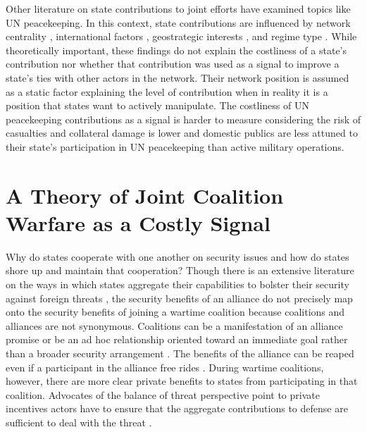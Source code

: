 \documentclass[12pt,letterpaper]{article}
\begin{document}
	Other literature on state contributions to joint efforts have examined topics like UN peacekeeping. In this context, state contributions are influenced by network centrality \citep{dorussen_networkedinternationalpolitics_2016}, international factors \citep{mullenbach_decidingkeeppeace_2005}, geostrategic interests \citep{baltrusaitis_friendsindeedcoalition_2008}, and regime type \citep{lebovic_unitingpeacedemocracies_2004}. While theoretically important, these findings do not explain the costliness of a state's contribution nor whether that contribution was used as a signal to improve a state's ties with other actors in the network. Their network position is assumed as a static factor explaining the level of contribution when in reality it is a position that states want to actively manipulate. The costliness of UN peacekeeping contributions as a signal is harder to measure considering the risk of casualties and collateral damage is lower and domestic publics are less attuned to their state's participation in UN peacekeeping than active military operations. 

\section{A Theory of Joint Coalition Warfare as a Costly Signal}
	Why do states cooperate with one another on security issues and how do states shore up and maintain that cooperation? Though there is an extensive literature on the ways in which states aggregate their capabilities to bolster their security against foreign threats \citep{waltz_theoryinternationalpolitics_1979}, the security benefits of an alliance do not precisely map onto the security benefits of joining a wartime coalition because coalitions and alliances are not synonymous. Coalitions can be a manifestation of an alliance promise or be an ad hoc relationship oriented toward an immediate goal rather than a broader security arrangement \citep[115]{weitsman_wartimealliancescoalition_2010}. The benefits of the alliance can be reaped even if a participant in the alliance free rides \citep{olson_economictheoryalliances_1966}. During wartime coalitions, however, there are more clear private benefits to states from participating in that coalition. Advocates of the balance of threat perspective point to private incentives actors have to ensure that the aggregate contributions to defense are sufficient to deal with the threat \citep{bennett_friendsneedburden_1997, baltrusaitis_coalitionpoliticsiraq_2010, davidson_neoclassicalrealistexplanation_2011}.
	
\end{document}

